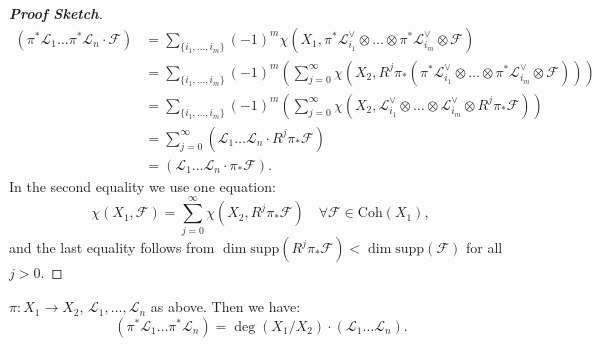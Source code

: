 \begin{proof}[\textbf{Proof Sketch}]
    \begin{align*}
        (\pi^*\mathcal{L}_1 \dots \pi^*\mathcal{L}_n \cdot \mathcal{F}) &= \sum_{\{i_1,\ldots,i_m\}} (-1)^m \chi(X_1, \pi^*\mathcal{L}_{i_1}^\vee \otimes \dots \otimes \pi^*\mathcal{L}_{i_m}^\vee \otimes \mathcal{F})\\
        &= \sum_{\{i_1,\ldots,i_m\}} (-1)^m \left(\sum_{j=0}^{\infty} \chi\left(X_2,R^j\pi_*(\pi^*\mathcal{L}_{i_1}^\vee \otimes \dots \otimes \pi^*\mathcal{L}_{i_m}^\vee \otimes \mathcal{F})\right)  \right)\\
        &= \sum_{\{i_1,\ldots,i_m\}} (-1)^m \left(\sum_{j=0}^{\infty} \chi\left(X_2,\mathcal{L}_{i_1}^\vee \otimes \dots \otimes \mathcal{L}_{i_m}^\vee \otimes R^j\pi_*\mathcal{F}\right)  \right)\\
        &= \sum_{j=0}^{\infty} (\mathcal{L}_1 \dots \mathcal{L}_n \cdot R^j\pi_*\mathcal{F})\\
        &= (\mathcal{L}_1 \dots \mathcal{L}_n \cdot \pi_*\mathcal{F}).
    \end{align*}
    In the second equality we use one equation:
    \[
    \chi(X_1,\mathcal{F}) = \sum_{j=0}^{\infty} \chi(X_2, R^j\pi_*\mathcal{F})\quad \forall \mathcal{F} \in \text{Coh}(X_1),
    \]
    and the last equality follows from $\dim\mathrm{supp}(R^j\pi_*\mathcal{F})<\dim\mathrm{supp}(\mathcal{F})$ for all $j>0$.
\end{proof}

\begin{corollary}[20.1.J]
    $\pi: X_1 \longrightarrow X_2$, $\mathcal{L}_1, \dots, \mathcal{L}_n$ as above.
    Then we have:
    \[
(\pi^*\mathcal{L}_1 \dots \pi^*\mathcal{L}_n) = \deg(X_1/X_2) \cdot (\mathcal{L}_1 \dots \mathcal{L}_n).
\]
\end{corollary}

